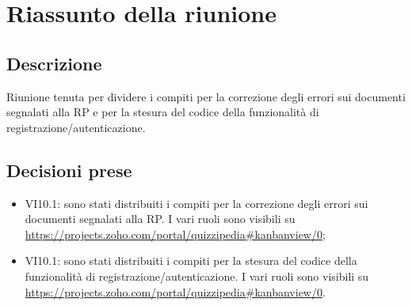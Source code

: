 \section{Riassunto della riunione}
\subsection{Descrizione}

Riunione tenuta per dividere i compiti per la correzione degli errori sui documenti segnalati alla RP e per la stesura del codice della funzionalità di registrazione/autenticazione.

\subsection{Decisioni prese}
\begin{itemize}
\item VI10.1: sono stati distribuiti i compiti per la correzione degli errori sui documenti segnalati alla RP. I vari ruoli sono visibili su \url{https://projects.zoho.com/portal/quizzipedia#kanbanview/0};
\item VI10.1: sono stati distribuiti i compiti per la  stesura del codice della funzionalità di registrazione/autenticazione. I vari ruoli sono visibili su \url{https://projects.zoho.com/portal/quizzipedia#kanbanview/0}.
\end{itemize}
